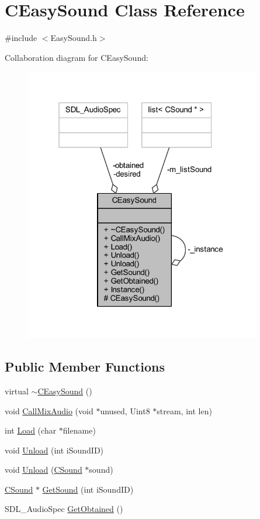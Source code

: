 \hypertarget{class_c_easy_sound}{}\section{C\+Easy\+Sound Class Reference}
\label{class_c_easy_sound}


{\ttfamily \#include $<$Easy\+Sound.\+h$>$}



Collaboration diagram for C\+Easy\+Sound\+:
\nopagebreak
\begin{figure}[H]
\begin{center}
\leavevmode
\includegraphics[width=292pt]{class_c_easy_sound__coll__graph}
\end{center}
\end{figure}
\subsection*{Public Member Functions}
\begin{DoxyCompactItemize}
\item 
virtual \hyperlink{class_c_easy_sound_a5cff415b6a13deb64871cfc2dfa33b3c}{$\sim$\+C\+Easy\+Sound} ()
\item 
void \hyperlink{class_c_easy_sound_a29fc35523c9eedb3b2589f90f27d03f0}{Call\+Mix\+Audio} (void $\ast$unused, Uint8 $\ast$stream, int len)
\item 
int \hyperlink{class_c_easy_sound_aa1d7ffd4f5c4891a863df85d6136daf1}{Load} (char $\ast$filename)
\item 
void \hyperlink{class_c_easy_sound_a88ac4b0af77d561c5fad4016ed9aedcf}{Unload} (int i\+Sound\+ID)
\item 
void \hyperlink{class_c_easy_sound_a7d7e9aa0f0b6cc79ab2cdb179ee9d29f}{Unload} (\hyperlink{class_c_sound}{C\+Sound} $\ast$sound)
\item 
\hyperlink{class_c_sound}{C\+Sound} $\ast$ \hyperlink{class_c_easy_sound_a871478c0717d884846c2a4f528860a5f}{Get\+Sound} (int i\+Sound\+ID)
\item 
S\+D\+L\+\_\+\+Audio\+Spec \hyperlink{class_c_easy_sound_a1d5a81eee0c6f787890375f3bc3ec37e}{Get\+Obtained} ()
\end{DoxyCompactItemize}
